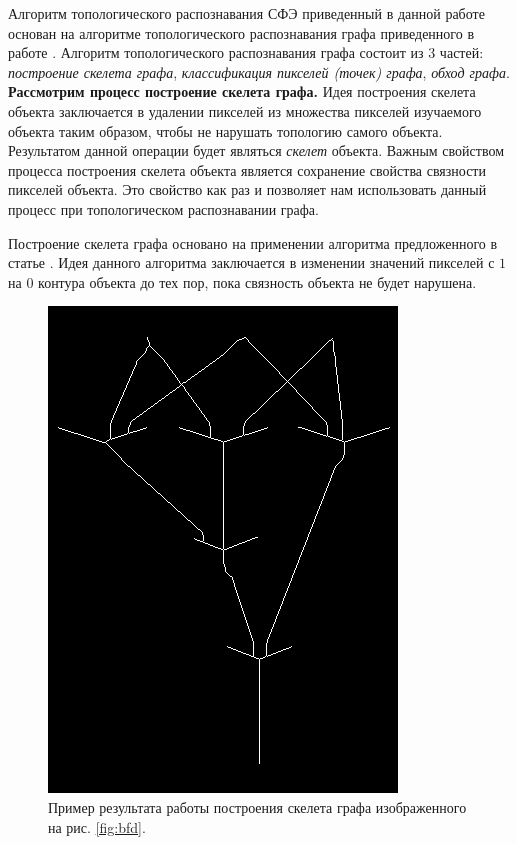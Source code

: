 \documentclass[makeidx, a4paper, 14pt]{extarticle}
\begin{document}
Алгоритм топологического распознавания СФЭ приведенный в данной работе основан на алгоритме топологического распознавания графа приведенного в работе \cite{auer13}.
Алгоритм топологического распознавания графа состоит из 3 частей: \emph{построение скелета графа}, \emph{классификация пикселей (точек) графа},
\emph{обход графа}. \\

\textbf{Рассмотрим процесс построение скелета графа.} Идея построения скелета объекта заключается в удалении пикселей из множества пикселей изучаемого объекта таким образом,
чтобы не нарушать топологию самого объекта. Результатом данной операции будет являться \emph{скелет} объекта.
Важным свойством процесса построения скелета объекта является сохранение свойства связности пикселей объекта. Это свойство
как раз и позволяет нам использовать данный процесс при топологическом распознавании графа.

Построение скелета графа основано на применении алгоритма предложенного в статье \cite{zhang_suen84}. Идея данного
алгоритма заключается в изменении значений пикселей с $1$ на $0$ контура объекта до тех пор, пока связность объекта не будет нарушена.

\begin{figure}[H]
    \centering
    \includegraphics[scale=0.75]{img4_skelet.png}
    \caption{Пример результата работы построения скелета графа изображенного на рис. \ref{fig:bfd}.}
\end{figure}
\end{document}
